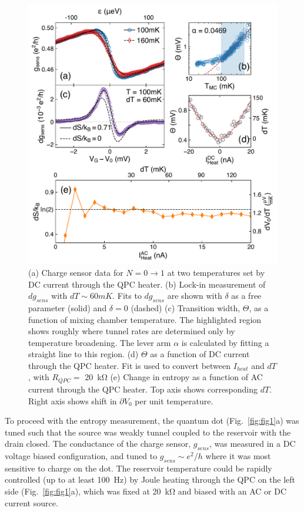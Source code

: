 \documentclass[twocolumn,showpacs,preprintnumbers,amsmath,amssymb,pra,aps,superscriptaddress]{revtex4-1}
\begin{document}
\begin{figure}[!]
        \includegraphics[width=1.0\columnwidth]{../figures/figure_2.pdf}
        \caption{\label{fig:fig2}(a) Charge sensor data for $N=0 \rightarrow 1$ at two temperatures set by DC current through the QPC heater. (b) Lock-in measurement of $dg_{sens}$ with $dT \sim 60mK$. Fits to $dg_{sens}$ are shown with $\delta$ as a free parameter (solid) and $\delta=0$ (dashed) (c) Transition width, $\Theta$, as a function of mixing chamber temperature. The highlighted region shows roughly where tunnel rates are determined only by temperature broadening. The lever arm $\alpha$ is calculated by fitting a straight line to this region. (d) $\Theta$ as a function of DC current through the QPC heater. Fit is used to convert between $I_{heat}$ and $dT$, with $R_{QPC} = $ \SI{20}{\kilo\ohm} (e) Change in entropy as a function of AC current through the QPC heater. Top axis shows corresponding $dT$. Right axis shows shift in $\partial V_0$ per unit temperature.}
\end{figure}

To proceed with the entropy measurement, the quantum dot (Fig.~\ref{fig:fig1}a) was tuned such that the source was weakly tunnel coupled to the reservoir with the drain closed. The conductance of the charge sensor,  $g_{sens}$, was measured in a DC voltage biased configuration, and tuned to $g_{sens}{\sim}e^2/h$ where it was most sensitive to charge on the dot.  The reservoir temperature could be rapidly controlled (up to at least  \SI{100}{\hertz}) by Joule heating through the QPC on the left side (Fig.~\ref{fig:fig1}a), which was fixed at \SI{20}{\kilo\ohm} and biased with an AC or DC current source.
\end{document}
